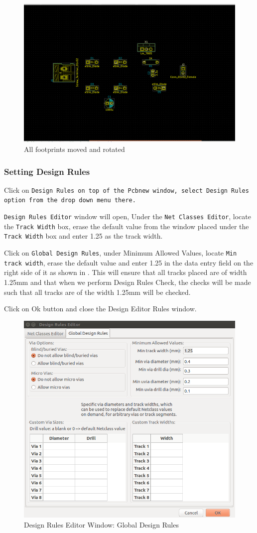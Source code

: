 \begin{compactenum}
\begin{figure}
\centering
\includegraphics[height=0.4\textwidth]{fpsmovedandrotated.png}
\caption{All footprints moved and rotated}
\label{rotateall}
\end{figure}
\end{compactenum}

\subsubsection{Setting Design Rules}

\begin{compactenum}
\item Click on \texttt{Design Rules on top of the Pcbnew window, select Design Rules option from the drop down menu there.}
\item \texttt{Design Rules Editor} window will open, Under the \texttt{Net Classes Editor}, locate the \texttt{Track Width} box, erase the default value from the window placed under the \texttt{Track Width} box and enter 1.25 as the track width.
\item Click on \texttt{Global Design Rules}, under Minimum Allowed Values, locate \texttt{Min track width}, erase the default value and enter 1.25 in the data entry field on the right side of it as shown in . This will ensure that all tracks placed are of width 1.25mm and that when we perform Design Rules Check, the checks will be made such that all tracks are of the width 1.25mm will be checked.
\item Click on Ok button and close the Design Editor Rules window.
\end{compactenum}

\begin{figure}
\centering
\includegraphics[height=0.4\textwidth]{druleseditor.png}
\caption{Design Rules Editor Window: Global Design Rules}
\label{DRC_GDR}
\end{figure}

